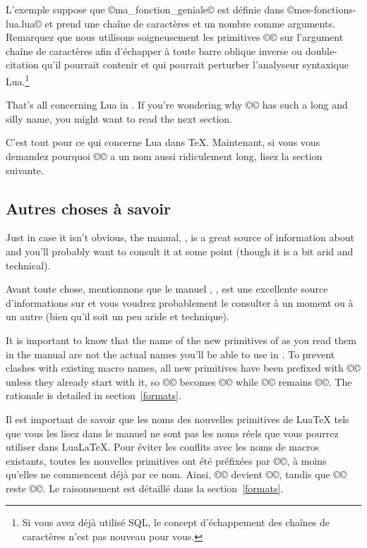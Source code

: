 \documentclass{lltxdoc}
\begin{document}
L'exemple suppose que ©ma_fonction_geniale© est définie dans ©mes-fonctions-lua.lua© et prend une chaîne de caractères et un nombre comme arguments. Remarquez que nous utilisons soigneusement les primitives ©\luatexluaescapestring© sur l'argument chaîne de caractères afin d'échapper à toute barre oblique inverse ou double-citation qu'il pourrait contenir et qui pourrait perturber l'analyseur syntaxique Lua.\footnote{Si vous avez déjà utilisé SQL, le concept d'échappement des chaînes de caractères n'est pas nouveau pour vous.}

\medskip

That's all concerning Lua in \tex. If you're wondering why
©\luatexluaescapestring© has such a long and silly name, you might want to
read the next section.

C'est tout pour ce qui concerne Lua dans TeX. Maintenant, si vous vous demandez pourquoi ©\luatexluaescapestring© a un nom aussi ridiculement long, lisez la section suivante.

\subsection{Autres choses à savoir}\label{things}

Just in case it isn't obvious, the \luatex manual, , is
a great source of information about \luatex and you'll probably want to
consult it at some point (though it is a bit arid and technical).

Avant toute chose, mentionnons que le manuel \luatex, , est une excellente source d'informations sur \luatex et vous voudrez probablement le consulter à un moment ou à un autre (bien qu'il soit un peu aride et technique).

It is important to know that the name of the new primitives of \luatex as you
read them in the manual are not the actual names you'll be able to use in
\lualatex. To prevent clashes with existing macro names, all new primitives
have been prefixed with ©\luatex© unless they already start with it, so
©\luaescapestring© becomes ©\luatexluaescapetring© while ©\luatexversion©
remains ©\luatexversion©. The rationale is detailed in section~\ref{formats}.

Il est important de savoir que les noms des nouvelles primitives de LuaTeX tels que vous les lisez dans le manuel ne sont pas les noms réels que vous pourrez utiliser dans LuaLaTeX. Pour éviter les conflits avec les noms de macros existants, toutes les nouvelles primitives ont été préfixées par ©\luatex©, à moins qu'elles ne commencent déjà par ce nom. Ainsi, ©\luaescapestring© devient ©\luatexluaescapetring©, tandis que ©\luatexversion© reste ©\luatexversion©. Le raisonnement est détaillé dans la section~\ref{formats}.
\end{document}
